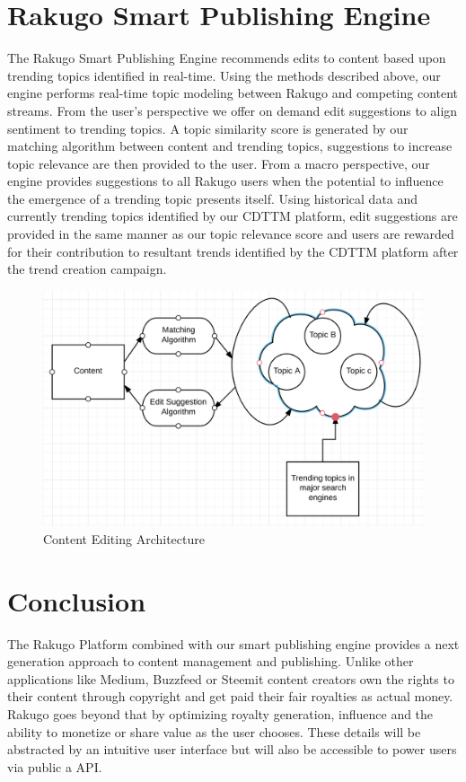 \documentclass{article}
\begin{document}
\section{Rakugo Smart Publishing Engine}
The Rakugo Smart Publishing Engine recommends edits to content based upon trending topics identified in real-time. Using the methods described above, our engine performs real-time topic modeling between Rakugo and competing content streams. From the user's perspective we offer on demand edit suggestions to align sentiment to trending topics. A topic similarity score is generated by our matching algorithm between content and trending topics, suggestions to increase topic relevance are then provided to the user. From a macro perspective, our engine provides suggestions to all Rakugo users when the potential to influence the emergence of a trending topic presents itself. Using historical data and currently trending topics identified by our CDTTM platform, edit suggestions are provided in the same manner as our topic relevance score and users are rewarded for their contribution to resultant trends identified by the CDTTM platform after the trend creation campaign.

\begin{figure}[H]
\centering
\includegraphics[scale=0.60]{smart_publishing_engine.png}
\caption{Content Editing Architecture}
\end{figure}

\section{Conclusion}
The Rakugo Platform combined with our smart publishing engine provides a next generation approach to content management and publishing. Unlike other applications like Medium, Buzzfeed or Steemit content creators own the rights to their content through copyright and get paid their fair royalties as actual money. Rakugo goes beyond that by optimizing royalty generation, influence and the ability to monetize or share value as the user chooses. These details will be abstracted by an intuitive user interface but will also be accessible to power users via public a API.
\end{document}
